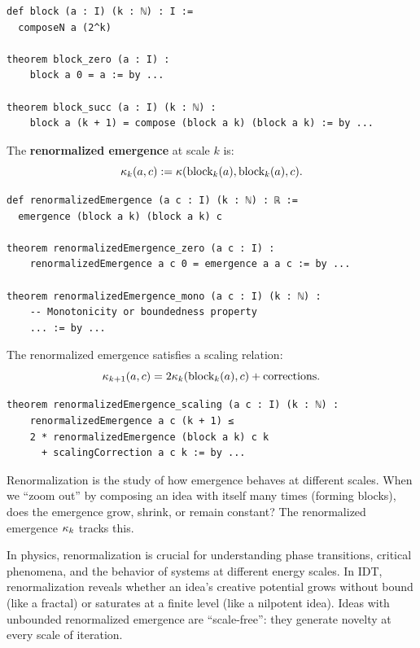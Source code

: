 \begin{lstlisting}[caption={Block composition (IDT\_v3\_Emergence.lean)}]
def block (a : I) (k : ℕ) : I :=
  composeN a (2^k)

theorem block_zero (a : I) :
    block a 0 = a := by ...

theorem block_succ (a : I) (k : ℕ) :
    block a (k + 1) = compose (block a k) (block a k) := by ...
\end{lstlisting}

\begin{definition}
\label{def:renormalized-emergence}
The \textbf{renormalized emergence} at scale $k$ is:
\[
  \kappa_k(a,c) := \kappa(\text{block}_k(a), \text{block}_k(a), c).
\]
\end{definition}

\begin{lstlisting}[caption={Renormalized emergence (IDT\_v3\_Emergence.lean)}]
def renormalizedEmergence (a c : I) (k : ℕ) : ℝ :=
  emergence (block a k) (block a k) c

theorem renormalizedEmergence_zero (a c : I) :
    renormalizedEmergence a c 0 = emergence a a c := by ...

theorem renormalizedEmergence_mono (a c : I) (k : ℕ) :
    -- Monotonicity or boundedness property
    ... := by ...
\end{lstlisting}

\begin{theorem}
\label{thm:renormalized-emergence-scaling}
The renormalized emergence satisfies a scaling relation:
\[
  \kappa_{k+1}(a,c) = 2\kappa_k(\text{block}_k(a), c) + \text{corrections}.
\]
\end{theorem}

\begin{lstlisting}[caption={Renormalization scaling (IDT\_v3\_Emergence.lean)}]
theorem renormalizedEmergence_scaling (a c : I) (k : ℕ) :
    renormalizedEmergence a c (k + 1) ≤
    2 * renormalizedEmergence (block a k) c k
      + scalingCorrection a c k := by ...
\end{lstlisting}

\begin{interpretation}
Renormalization is the study of how emergence behaves at different scales.
When we ``zoom out'' by composing an idea with itself many times (forming blocks),
does the emergence grow, shrink, or remain constant? The renormalized emergence
$\kappa_k$ tracks this.

In physics, renormalization is crucial for understanding phase transitions,
critical phenomena, and the behavior of systems at different energy scales.
In IDT, renormalization reveals whether an idea's creative potential grows
without bound (like a fractal) or saturates at a finite level (like a nilpotent
idea). Ideas with unbounded renormalized emergence are ``scale-free'': they
generate novelty at every scale of iteration.
\end{interpretation}



